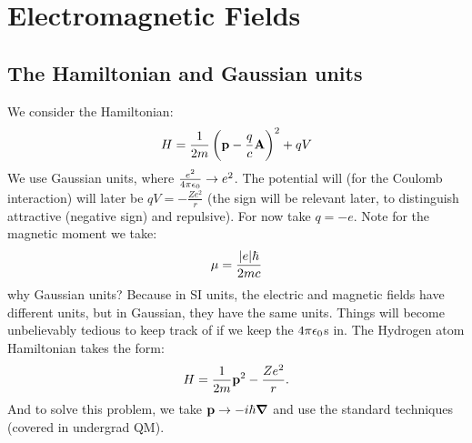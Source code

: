 \section{Electromagnetic Fields}
\subsection{The Hamiltonian and Gaussian units}
We consider the Hamiltonian:
\begin{equation}\label{eq-Hem}
    H = \frac{1}{2m}\left(\mathbf{p} - \frac{q}{c}\mathbf{A}\right)^2 + qV
\end{equation}
We use Gaussian units, where $\frac{e^2}{4\pi \epsilon_0} \to e^2$. The potential will (for the Coulomb interaction) will later be $qV = -\frac{Ze^2}{r}$ (the sign will be relevant later, to distinguish attractive (negative sign) and repulsive). For now take $q = -e$. Note for the magnetic moment we take:
\begin{equation}
    \mu = \frac{\lvert e \rvert\hbar}{2mc}
\end{equation}
why Gaussian units? Because in SI units, the electric and magnetic fields have different units, but in Gaussian, they have the same units. Things will become unbelievably tedious to keep track of if we keep the $4\pi\epsilon_0$s in. The Hydrogen atom Hamiltonian takes the form:
\begin{equation}
    H = \frac{1}{2m}\mathbf{p}^2 - \frac{Ze^2}{r}.
\end{equation}
And to solve this problem, we take $\v{p} \to -i\hbar \nabla$ and use the standard techniques (covered in undergrad QM).

